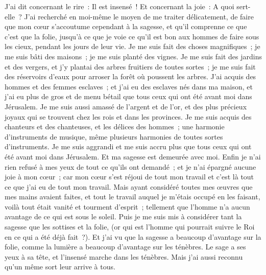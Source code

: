 \begin{multicols}{2}
J'ai dit concernant le rire~: Il est insensé~! Et concernant la joie~: A quoi sert-elle~?
J'ai recherché en moi-même le moyen de me traiter délicatement, de faire que mon cœur s'accoutume cependant à la sagesse, et qu'il comprenne ce que c'est que la folie, jusqu'à ce que je voie ce qu'il est bon aux hommes de faire sous les cieux, pendant les jours de leur vie. 
Je me suis fait des choses magnifiques~; je me suis bâti des maisons~; je me suis planté des vignes.
Je me suis fait des jardins et des vergers, et j'y plantai des arbres fruitiers de toutes sortes~;
je me suis fait des réservoirs d'eaux pour arroser la forêt où poussent les arbres.
J'ai acquis des hommes et des femmes esclaves~; et j'ai eu des esclaves nés dans ma maison, et j'ai eu plus de gros et de menu bétail que tous ceux qui ont été avant moi dans Jérusalem. 
Je me suis aussi amassé de l'argent et de l'or, et des plus précieux joyaux qui se trouvent chez les rois et dans les provinces. Je me suis acquis des chanteurs et des chanteuses, et les délices des hommes~; une harmonie d'instruments de musique, même plusieurs harmonies de toutes sortes d'instruments. 
Je me suis aggrandi et me suis accru plus que tous ceux qui ont été avant moi dans Jérusalem. Et ma sagesse est demeurée avec moi.
Enfin je n'ai rien refusé à mes yeux de tout ce qu'ils ont demandé~; et je n'ai épargné aucune joie à mon cœur~; car mon cœur s'est réjoui de tout mon travail et c'est là tout ce que j'ai eu de tout mon travail.
Mais ayant considéré toutes mes œuvres que mes mains avaient faites, et tout le travail auquel je m'étais occupé en les faisant, voilà tout était vanité et tourment d'esprit~; tellement que l'homme n'a aucun avantage de ce qui est sous le soleil.
Puis je me suis mis à considérer tant la sagesse que les sottises et la folie, (or qui est l'homme qui pourrait suivre le Roi en ce qui a été déjà fait~?).
Et j'ai vu que la sagesse a beaucoup d'avantage sur la folie, comme la lumière a beaucoup d'avantage sur les ténèbres.
Le sage a ses yeux à sa tête, et l'insensé marche dans les ténèbres. Mais j'ai aussi reconnu qu'un même sort leur arrive à tous.

\end{multicols}
